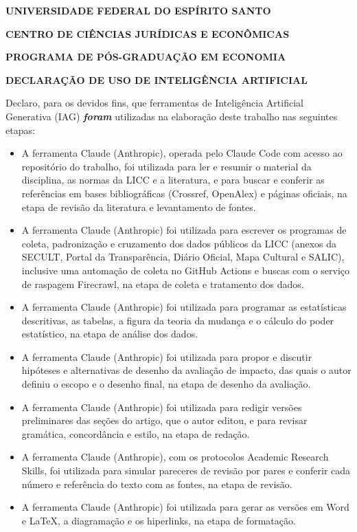 \documentclass[12pt,a4paper]{article}
\begin{document}
\thispagestyle{empty}
\begin{center}
{\bfseries UNIVERSIDADE FEDERAL DO ESPÍRITO SANTO\par}
{\bfseries CENTRO DE CIÊNCIAS JURÍDICAS E ECONÔMICAS\par}
{\bfseries PROGRAMA DE PÓS-GRADUAÇÃO EM ECONOMIA\par}
\vspace{12pt}
{\bfseries DECLARAÇÃO DE USO DE INTELIGÊNCIA ARTIFICIAL\par}
\end{center}
\vspace{6pt}
\begingroup\setlength{\parindent}{0pt}\setlength{\parskip}{6pt}
Declaro, para os devidos fins, que ferramentas de Inteligência Artificial Generativa (IAG)
\textbf{\emph{foram}} utilizadas na elaboração deste trabalho nas seguintes etapas:

\begin{itemize}
\item
  A ferramenta Claude (Anthropic), operada pelo Claude Code com acesso ao repositório do trabalho,
  foi utilizada para ler e resumir o material da disciplina, as normas da LICC e a literatura, e
  para buscar e conferir as referências em bases bibliográficas (Crossref, OpenAlex) e páginas
  oficiais, na etapa de revisão da literatura e levantamento de fontes.
\item
  A ferramenta Claude (Anthropic) foi utilizada para escrever os programas de coleta, padronização e
  cruzamento dos dados públicos da LICC (anexos da SECULT, Portal da Transparência, Diário Oficial,
  Mapa Cultural e SALIC), inclusive uma automação de coleta no GitHub Actions e buscas com o serviço
  de raspagem Firecrawl, na etapa de coleta e tratamento dos dados.
\item
  A ferramenta Claude (Anthropic) foi utilizada para programar as estatísticas descritivas, as
  tabelas, a figura da teoria da mudança e o cálculo do poder estatístico, na etapa de análise dos
  dados.
\item
  A ferramenta Claude (Anthropic) foi utilizada para propor e discutir hipóteses e alternativas de
  desenho da avaliação de impacto, das quais o autor definiu o escopo e o desenho final, na etapa de
  desenho da avaliação.
\item
  A ferramenta Claude (Anthropic) foi utilizada para redigir versões preliminares das seções do
  artigo, que o autor editou, e para revisar gramática, concordância e estilo, na etapa de redação.
\item
  A ferramenta Claude (Anthropic), com os protocolos Academic Research Skills, foi utilizada para
  simular pareceres de revisão por pares e conferir cada número e referência do texto com as fontes,
  na etapa de revisão.
\item
  A ferramenta Claude (Anthropic) foi utilizada para gerar as versões em Word e LaTeX, a diagramação
  e os hiperlinks, na etapa de formatação.
\end{itemize}
\end{document}
